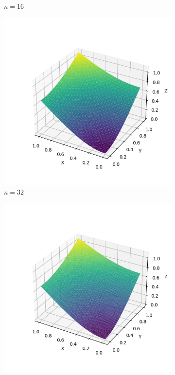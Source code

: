 \documentclass[lang=cn,a4paper,newtx,bibend=bibtex]{elegantpaper}
\begin{document}
\begin{figure}[H]
\begin{subfigure}[b]{0.18\textwidth}
      \caption{$n= 16$}
  \end{subfigure}
  \hfill
  \begin{subfigure}[b]{0.18\textwidth}
      \includegraphics[width=\textwidth]{../../res_bac/res-[data|3-mixed-regular-c32].png}
      \caption{$n = 32$}
  \end{subfigure}
  \hfill
  \begin{subfigure}[b]{0.18\textwidth}
      \includegraphics[width=\textwidth]{../../res_bac/res-[data|3-mixed-regular-d64].png}

\end{subfigure}
\end{figure}
\end{document}

